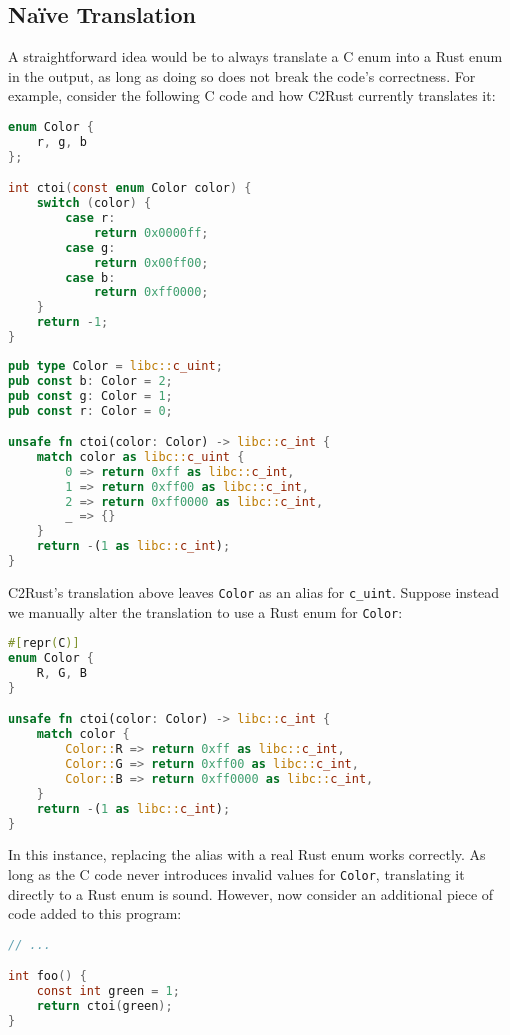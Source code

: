 \documentclass[10pt,conference]{IEEEtran}
\begin{document}
\subsection{Na\"ive Translation}

A straightforward idea would be to always translate a C enum into a Rust enum in the output, as long as doing so does not break the code's correctness. For example, consider the following C code and how C2Rust currently translates it:

\begin{lstlisting}[language=C]
enum Color {
    r, g, b
};

int ctoi(const enum Color color) {
    switch (color) {
        case r:
            return 0x0000ff;
        case g:
            return 0x00ff00;
        case b:
            return 0xff0000;
    }
    return -1;
}
\end{lstlisting}

\begin{lstlisting}[language=Rust]
pub type Color = libc::c_uint;
pub const b: Color = 2;
pub const g: Color = 1;
pub const r: Color = 0;

unsafe fn ctoi(color: Color) -> libc::c_int {
    match color as libc::c_uint {
        0 => return 0xff as libc::c_int,
        1 => return 0xff00 as libc::c_int,
        2 => return 0xff0000 as libc::c_int,
        _ => {}
    }
    return -(1 as libc::c_int);
}
\end{lstlisting}

C2Rust's translation above leaves \texttt{Color} as an alias for \texttt{c\_uint}. Suppose instead we manually alter the translation to use a Rust enum for \texttt{Color}:

\begin{lstlisting}[language=Rust]
#[repr(C)]
enum Color {
    R, G, B
}

unsafe fn ctoi(color: Color) -> libc::c_int {
    match color {
        Color::R => return 0xff as libc::c_int,
        Color::G => return 0xff00 as libc::c_int,
        Color::B => return 0xff0000 as libc::c_int,
    }
    return -(1 as libc::c_int);
}
\end{lstlisting}

In this instance, replacing the alias with a real Rust enum works correctly. As long as the C code never introduces invalid values for \texttt{Color}, translating it directly to a Rust enum is sound. However, now consider an additional piece of code added to this program:

\begin{lstlisting}[language=C, label=lst:example]
// ...

int foo() {
    const int green = 1;
    return ctoi(green);
}
\end{lstlisting}
\end{document}
